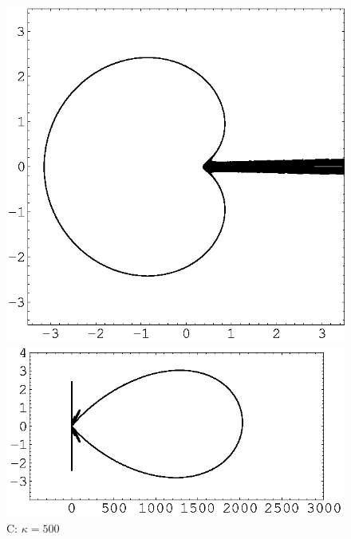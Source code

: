 \documentclass[12pt]{article}
\begin{document}
\begin{figure}[p]
\begin{center}
\includegraphics[scale=0.5]{./C2.eps}\includegraphics[scale=0.9]{./C1.eps}\\ 
{\footnotesize C: $\kappa=500$}\\
\vspace{3mm}

\end{center}
\end{figure}
\end{document}

